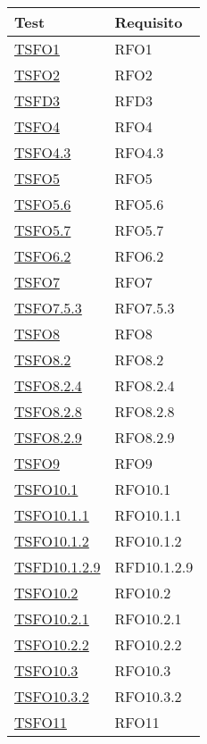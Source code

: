 \normalsize
\begin{longtable}{|>{\centering}m{5cm}|m{5cm}<{\centering}|}
	\hline \rowcolor{Gray}
	\textbf{Test} & \textbf{Requisito}\\
	\hline
	\endhead
	\hyperlink{TSFO1}{TSFO1} & RFO1\\ \hline
	\hyperlink{TSFO2}{TSFO2} & RFO2\\ \hline
	\hyperlink{TSFD3}{TSFD3} & RFD3\\ \hline
	\hyperlink{TSFO4}{TSFO4} & RFO4\\ \hline
	\hyperlink{TSFO4.3}{TSFO4.3} & RFO4.3\\ \hline
	\hyperlink{TSFO5}{TSFO5} & RFO5\\ \hline
	\hyperlink{TSFO5.6}{TSFO5.6} & RFO5.6\\ \hline
	\hyperlink{TSFO5.7}{TSFO5.7} & RFO5.7\\ \hline
	\hyperlink{TSFO6.2}{TSFO6.2} & RFO6.2\\ \hline
	\hyperlink{TSFO7}{TSFO7} & RFO7\\ \hline
	\hyperlink{TSFO7.5.3}{TSFO7.5.3} & RFO7.5.3\\ \hline
	\hyperlink{TSFO8}{TSFO8} & RFO8\\ \hline
	\hyperlink{TSFO8.2}{TSFO8.2} & RFO8.2\\ \hline
	\hyperlink{TSFO8.2.4}{TSFO8.2.4} & RFO8.2.4\\ \hline
	\hyperlink{TSFO8.2.8}{TSFO8.2.8} & RFO8.2.8\\ \hline
	\hyperlink{TSFO8.2.9}{TSFO8.2.9} & RFO8.2.9\\ \hline
	\hyperlink{TSFO9}{TSFO9} & RFO9\\ \hline
	\hyperlink{TSFO10.1}{TSFO10.1} & RFO10.1\\ \hline
	\hyperlink{TSFO10.1.1}{TSFO10.1.1} & RFO10.1.1\\ \hline
	\hyperlink{TSFO10.1.2}{TSFO10.1.2} & RFO10.1.2\\ \hline
	\hyperlink{TSFD10.1.2.9}{TSFD10.1.2.9} & RFD10.1.2.9\\ \hline
	\hyperlink{TSFO10.2}{TSFO10.2} & RFO10.2\\ \hline
	\hyperlink{TSFO10.2.1}{TSFO10.2.1} & RFO10.2.1\\ \hline
	\hyperlink{TSFO10.2.2}{TSFO10.2.2} & RFO10.2.2\\ \hline
	\hyperlink{TSFO10.3}{TSFO10.3} & RFO10.3\\ \hline
	\hyperlink{TSFO10.3.2}{TSFO10.3.2} & RFO10.3.2\\ \hline
	\hyperlink{TSFO11}{TSFO11} & RFO11\\ \hline

\end{longtable}

